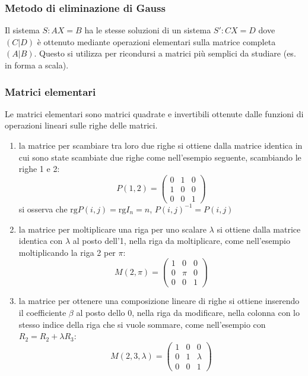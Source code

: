 \documentclass[a4paper]{article}
\newcommand\rg{\text{rg}} 		%
\begin{document}
\subsubsection*{Metodo di eliminazione di Gauss}
Il sistema \(S: AX = B\) ha le stesse soluzioni di un sistema \(S': CX = D\) dove \((C|D)\) è ottenuto mediante operazioni elementari
sulla matrice completa \((A|B)\). Questo si utilizza per ricondursi a matrici più semplici da studiare (es. in forma a scala).

\newpage

\subsubsection*{Matrici elementari}
Le matrici elementari sono matrici quadrate e invertibili ottenute dalle funzioni di operazioni lineari sulle righe delle matrici.
\begin{enumerate}
	\item la matrice per scambiare tra loro due righe si ottiene dalla matrice identica in cui sono state scambiate due righe
	come nell'esempio seguente, scambiando le righe 1 e 2:
	\[P(1,2) = \begin{pmatrix}
		0 & 1 & 0 \\
		1 & 0 & 0 \\
		0 & 0 & 1
	\end{pmatrix}\]
	si osserva che \(\rg P(i,j) = \rg I_n = n\), \(P(i,j)^{-1} = P(i,j)\)
	
	\item la matrice per moltiplicare una riga per uno scalare \(\lambda\) si ottiene dalla matrice identica con \(\lambda\)
	al posto dell'1, nella riga da moltiplicare, come nell'esempio moltiplicando la riga 2 per \(\pi\):
	\[M(2,\pi) = \begin{pmatrix}
		1 & 0 & 0 \\
		0 & \pi & 0 \\
		0 & 0 & 1
	\end{pmatrix}\]
	
	\item la matrice per ottenere una composizione lineare di righe si ottiene inserendo il coefficiente \(\beta\) al posto
	dello 0, nella riga da modificare, nella colonna con lo stesso indice della riga che si vuole sommare, come nell'esempio
	con \(R_2 = R_2 + \lambda R_3\):
	\[M(2, 3, \lambda) = \begin{pmatrix}
		1 & 0 & 0 \\
		0 & 1 & \lambda \\
		0 & 0 & 1
	\end{pmatrix}\]
\end{enumerate}
\end{document}
